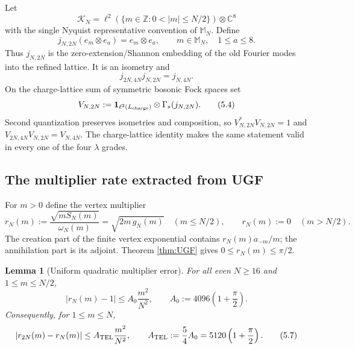 \documentclass[11pt]{article}
\newtheorem{lemma}[theorem]{Lemma}
\theoremstyle{remark}
\newcommand{\C}{\mathbb C}
\newcommand{\Z}{\mathbb Z}
\newcommand{\id}{\mathbf 1}
\begin{document}
Let
\[
 \mathcal K_N
 =\ell^2\!\left(\{m\in\Z:0<|m|\le N/2\}\right)\otimes\C^8
\tag{5.1}\label{eq:oneparticleboson}
\]
with the single Nyquist representative convention of
$\mathbb M_N$.  Define
\[
 j_{N,2N}(e_m\otimes e_a)=e_m\otimes e_a,
\qquad m\in\mathbb M_N,\quad 1\le a\le8.
\tag{5.2}\label{eq:modeisometry}
\]
Thus $j_{N,2N}$ is the zero-extension/Shannon embedding of the old
Fourier modes into the refined lattice.  It is an isometry and
\[
 j_{2N,4N}j_{N,2N}=j_{N,4N}.
\tag{5.3}\label{eq:modecompat}
\]
On the charge-lattice sum of symmetric bosonic Fock spaces set
\[
 V_{N,2N}
 :=\id_{\ell^2(L_{\rm charge})}\otimes\Gamma_s(j_{N,2N}).
\tag{5.4}\label{eq:Fockisometry}
\]
Second quantization preserves isometries and composition, so
$V_{N,2N}^*V_{N,2N}=1$ and
$V_{2N,4N}V_{N,2N}=V_{N,4N}$.  The charge-lattice identity makes the
same statement valid in every one of the four $\lambda$ grades.

\subsection{The multiplier rate extracted from UGF}

For $m>0$ define the vertex multiplier
\[
 r_N(m)
 :=\frac{\sqrt{mS_N(m)}}{\omega_N(m)}
 =\sqrt{2m\,g_N(m)}
\quad (m\le N/2),
\qquad
 r_N(m):=0\quad(m>N/2).
\tag{5.5}\label{eq:vertexmultiplier}
\]
The creation part of the finite vertex exponential contains
$r_N(m)a_{-m}/m$; the annihilation part is its adjoint.  Theorem
\ref{thm:UGF} gives $0\le r_N(m)\le\pi/2$.

\begin{lemma}[Uniform quadratic multiplier error]\label{lem:multiplier}
For all even $N\ge16$ and $1\le m\le N/2$,
\[
 |r_N(m)-1|
 \le A_0\frac{m^2}{N^2},
\qquad
 A_0:=4096\left(1+\frac\pi2\right).
\tag{5.6}\label{eq:rNrate}
\]
Consequently, for $1\le m\le N$,
\[
 |r_{2N}(m)-r_N(m)|
 \le A_{\rm TEL}\frac{m^2}{N^2},
\qquad
 A_{\rm TEL}:=\frac54A_0
 =5120\left(1+\frac\pi2\right).
\tag{5.7}\label{eq:dyadicmultiplier}
\]
\end{lemma}
\end{document}
